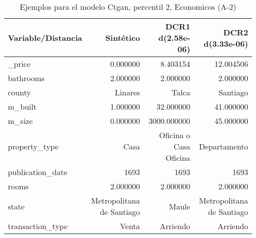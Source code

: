 \begin{table}[H]
\centering
\fontsize{10}{14}\selectfont
\caption{Ejemplos para el modelo Ctgan, percentil 2, Economicos (A-2)}
\label{table-example-economicos-a-2-ctgan-2p}
\begin{tabular}{|l|r|r|r|}
\hline
\rowcolor[gray]{0.8}
Variable/Distancia & Sintético & DCR1 d(2.58e-06) & DCR2 d(3.33e-06) \\
\hline \_price & \cellcolor[rgb]{0.9, 0.54, 0.52} 0.000000 & 8.403154 & 12.004506 \\
\hline bathrooms & \cellcolor[rgb]{0.9, 0.54, 0.52} 2.000000 & \cellcolor[rgb]{0.9, 0.54, 0.52} 2.000000 & \cellcolor[rgb]{0.9, 0.54, 0.52} 2.000000 \\
\hline county & \cellcolor[rgb]{0.9, 0.54, 0.52} Linares & Talca & Santiago \\
\hline m\_built & \cellcolor[rgb]{0.9, 0.54, 0.52} 1.000000 & 32.000000 & 41.000000 \\
\hline m\_size & \cellcolor[rgb]{0.9, 0.54, 0.52} 0.000000 & 3000.000000 & 45.000000 \\
\hline property\_type & \cellcolor[rgb]{0.9, 0.54, 0.52} Casa & Oficina o Casa Oficina & Departamento \\
\hline publication\_date & \cellcolor[rgb]{0.9, 0.54, 0.52} 1693 & \cellcolor[rgb]{0.9, 0.54, 0.52} 1693 & \cellcolor[rgb]{0.9, 0.54, 0.52} 1693 \\
\hline rooms & \cellcolor[rgb]{0.9, 0.54, 0.52} 2.000000 & \cellcolor[rgb]{0.9, 0.54, 0.52} 2.000000 & \cellcolor[rgb]{0.9, 0.54, 0.52} 2.000000 \\
\hline state & \cellcolor[rgb]{0.9, 0.54, 0.52} Metropolitana de Santiago & Maule & \cellcolor[rgb]{0.9, 0.54, 0.52} Metropolitana de Santiago \\
\hline transaction\_type & \cellcolor[rgb]{0.9, 0.54, 0.52} Venta & Arriendo & Arriendo \\
\hline
\end{tabular}
\end{table}
